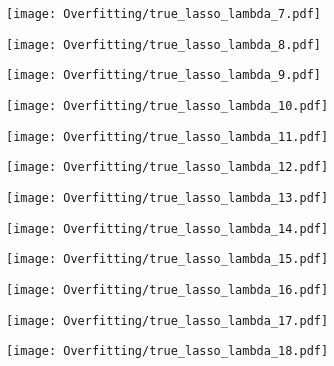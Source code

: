 \documentclass[xcolor=pdftex,dvipsnames,table]{beamer}
\begin{document}
\frame
{
	\begin{center}
		\texttt{[image: Overfitting/true\_lasso\_lambda\_7.pdf]}
	\end{center}
}

\frame
{
	\begin{center}
		\texttt{[image: Overfitting/true\_lasso\_lambda\_8.pdf]}
	\end{center}
}

\frame
{
	\begin{center}
		\texttt{[image: Overfitting/true\_lasso\_lambda\_9.pdf]}
	\end{center}
}

\frame
{
	\begin{center}
		\texttt{[image: Overfitting/true\_lasso\_lambda\_10.pdf]}
	\end{center}
}

\frame
{
	\begin{center}
		\texttt{[image: Overfitting/true\_lasso\_lambda\_11.pdf]}
	\end{center}
}

\frame
{
	\begin{center}
		\texttt{[image: Overfitting/true\_lasso\_lambda\_12.pdf]}
	\end{center}
}

\frame
{
	\begin{center}
		\texttt{[image: Overfitting/true\_lasso\_lambda\_13.pdf]}
	\end{center}
}

\frame
{
	\begin{center}
		\texttt{[image: Overfitting/true\_lasso\_lambda\_14.pdf]}
	\end{center}
}

\frame
{
	\begin{center}
		\texttt{[image: Overfitting/true\_lasso\_lambda\_15.pdf]}
	\end{center}
}

\frame
{
	\begin{center}
		\texttt{[image: Overfitting/true\_lasso\_lambda\_16.pdf]}
	\end{center}
}

\frame
{
	\begin{center}
		\texttt{[image: Overfitting/true\_lasso\_lambda\_17.pdf]}
	\end{center}
}

\frame
{
	\begin{center}
		\texttt{[image: Overfitting/true\_lasso\_lambda\_18.pdf]}
	\end{center}
}
\end{document}
